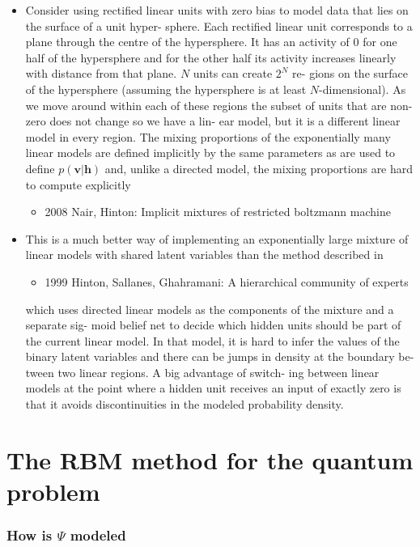 \documentclass[twoside,english]{uiofysmaster}
\begin{document}
\begin{itemize}
\begin{itemize}
		\item Consider using rectified linear units with zero bias to model data that lies on the surface of a unit hyper- sphere. Each rectified linear unit corresponds to a plane through the centre of the hypersphere. It has an activity of 0 for one half of the hypersphere and for the other half its activity increases linearly with distance from that plane. $N$ units can create $2^N$ re- gions on the surface of the hypersphere (assuming the hypersphere is at least $N$-dimensional). As we move around within each of these regions the subset of units that are non-zero does not change so we have a lin- ear model, but it is a different linear model in every region. The mixing proportions of the exponentially many linear models are defined implicitly by the same parameters as are used to define $p(\bm{v}|\bm{h})$ and, unlike a directed model, the mixing proportions are hard to compute explicitly 
		\begin{itemize}
			\item 2008 Nair, Hinton: Implicit mixtures of restricted boltzmann machine
		\end{itemize}
		\item This is a much better way of implementing an exponentially large mixture of linear models with shared latent variables than the method described in
		\begin{itemize}
			\item 1999 Hinton, Sallanes, Ghahramani: A hierarchical community of experts
		\end{itemize}
		 which uses directed linear models as the components of the mixture and a separate sig- moid belief net to decide which hidden units should be part of the current linear model. In that model, it is hard to infer the values of the binary latent variables and there can be jumps in density at the boundary be- tween two linear regions. A big advantage of switch- ing between linear models at the point where a hidden unit receives an input of exactly zero is that it avoids discontinuities in the modeled probability density.
	\end{itemize}
\end{itemize}

\chapter{The RBM method for the quantum problem}
\subsection{How is $\Psi$ modeled}
\end{document}
